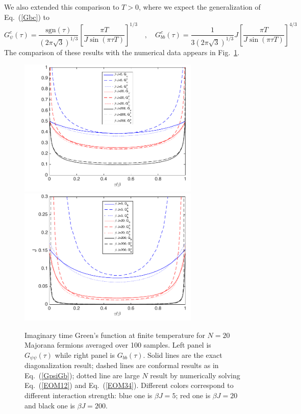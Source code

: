 \documentclass[aps,pre,preprint,onecolumn,citeautoscript,superscriptaddress,nofootinbib,eqsecnum]{revtex4-1}
\newcommand{\beq}{\begin{equation}}
\newcommand{\eeq}{\end{equation}}
\begin{document}
We also extended this comparison to $T>0$, where we expect the generalization of Eq.~(\ref{Gbc}) to 
\beq
G_{\psi}^c(\tau) = \frac{\mbox{sgn}(\tau)}{(2 \pi \sqrt{3})^{1/3}} \left[\frac{\pi T}{J \sin{(\pi\tau T)}}\right]^{1/3}
\quad,\quad
G_{bb}^c(\tau) = \frac{1}{3(2 \pi \sqrt{3} )^{1/3}} J \left[\frac{\pi T}{ J \sin{(\pi\tau T)}}\right]^{4/3}
\label{GpsiGb}
\eeq
The comparison of these results with the numerical data appears in Fig.~\ref{Fig:GpsiGbfiniteT}.
\begin{figure}[h]
\center
\includegraphics[width=3.4in]{GpsifiniteT.pdf}
\includegraphics[width=3.4in]{GbfiniteT.pdf}
\caption{Imaginary time Green's function at finite temperature for $N=20$ Majorana fermions averaged over 100 samples. Left panel is $G_{\psi\psi}(\tau)$ while right panel is $G_{bb}(\tau)$. Solid lines are the exact diagonalization result; dashed lines are conformal results as in Eq.~(\ref{GpsiGb}); dotted line are large $N$ result by numerically solving Eq.~(\ref{EOM12}) and Eq.~(\ref{EOM34}). Different colors correspond to different interaction strength: blue one is $\beta J=5$; red one is $\beta J=20$ and black one is $\beta J=200$. }
\label{Fig:GpsiGbfiniteT}
\end{figure}
\end{document}

